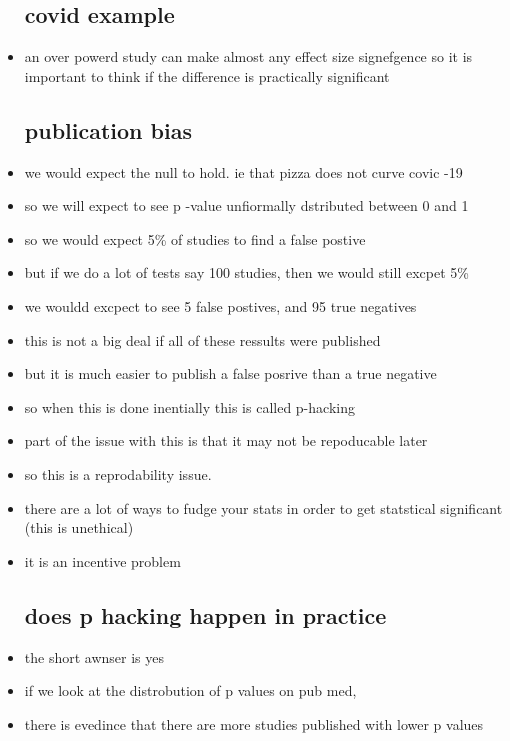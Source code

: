 \documentclass{article}
\begin{document}
\begin{itemize}
\subsection*{covid example}
\item an over powerd study can make almost any effect size signefgence so it is important to think if the difference is practically significant
\subsection*{publication bias}
\item we would expect the null to hold. ie that pizza does not curve covic -19 
\item so we will expect to see p -value unfiormally dstributed between 0 and 1 
\item so we would expect 5\% of studies to find a false postive 
\item but if we do a lot of tests say 100 studies, then we would still excpet 5\% 
\item we wouldd excpect to see 5 false postives, and 95 true negatives 
\item this is not a big deal if all of these ressults were published 
\item but it is much easier to publish a false posrive than a true negative 
\item so when this is done inentially this is called p-hacking 
\item part of the issue with this is that it may not be repoducable later
\item so this is a reprodability issue. 
\item there are a lot of ways to fudge your stats in order to get statstical significant (this is unethical) 
\item it is an incentive problem 
\subsection*{does p hacking happen in practice}
\item the short awnser is yes 
\item if we look at the distrobution of p values on pub med,
\item there is evedince that there are more studies published with lower p values



\end{itemize}
\end{document}
